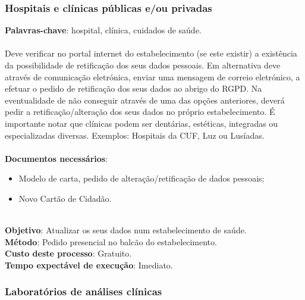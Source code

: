 \subsubsection{Hospitais e clínicas públicas e/ou privadas}

\textbf{Palavras-chave}: hospital, clínica, cuidados de saúde. \\
\\
Deve verificar no portal internet do estabelecimento (se este existir) a
existência da possibilidade de retificação dos seus dados pessoais. Em
alternativa deve através de comunicação eletrónica, enviar uma mensagem
de correio eletrónico, a efetuar o pedido de retificação dos seus dados
ao abrigo do RGPD. Na eventualidade de não conseguir através de uma das
opções anteriores, deverá pedir a retificação/alteração dos seus dados
no próprio estabelecimento. É importante notar que clínicas podem ser
dentárias, estéticas, integradas ou especializadas diversas. Exemplos:
Hospitais da CUF, Luz ou Lusíadas. \\
\\
\textbf{Documentos necessários}:
\begin{itemize}
	\item Modelo de carta, pedido de alteração/retificação de dados pessoais;
	\item Novo Cartão de Cidadão.
\end{itemize}
\leavevmode\\
\textbf{Objetivo}: Atualizar os seus dados num estabelecimento de saúde. \\
\textbf{Método}: Pedido presencial no balcão do estabelecimento. \\
\textbf{Custo deste processo}: Gratuito. \\
\textbf{Tempo expectável de	execução}: Imediato. \\

\newpage

\subsubsection{Laboratórios de análises clínicas}

